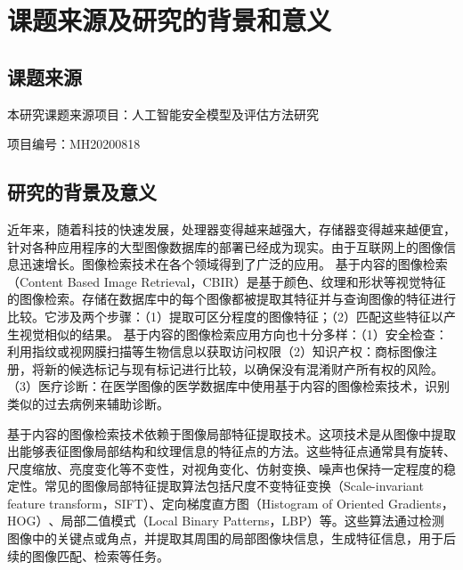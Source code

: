 \section{课题来源及研究的背景和意义}
\subsection{课题来源}
本研究课题来源项目：人工智能安全模型及评估方法研究
\par
项目编号：MH20200818
\subsection{研究的背景及意义}
近年来，随着科技的快速发展，处理器变得越来越强大，存储器变得越来越便宜，针对各种应用程序的大型图像数据库的部署已经成为现实。由于互联网上的图像信息迅速增长。图像检索技术在各个领域得到了广泛的应用。
基于内容的图像检索\cite{2015Content}（Content Based Image Retrieval，CBIR）是基于颜色、纹理和形状等视觉特征的图像检索。存储在数据库中的每个图像都被提取其特征并与查询图像的特征进行比较。它涉及两个步骤：（1）提取可区分程度的图像特征；（2）匹配这些特征以产生视觉相似的结果。
基于内容的图像检索应用方向也十分多样：（1）安全检查：利用指纹或视网膜扫描等生物信息以获取访问权限（2）知识产权：商标图像注册，将新的候选标记与现有标记进行比较，以确保没有混淆财产所有权的风险。（3）医疗诊断：在医学图像的医学数据库中使用基于内容的图像检索技术，识别类似的过去病例来辅助诊断。
\par
基于内容的图像检索技术依赖于图像局部特征提取技术。这项技术是从图像中提取出能够表征图像局部结构和纹理信息的特征点的方法。‌这些特征点通常具有旋转、‌尺度缩放、‌亮度变化等不变性，对视角变化、‌仿射变换、‌噪声也保持一定程度的稳定性。‌常见的图像局部特征提取算法包括‌尺度不变特征变换\cite{loweDistinctiveImageFeatures2004}（Scale-invariant feature transform，SIFT）、定向梯度直方图\cite{1467360}（Histogram of Oriented Gradients，HOG）‌、局部二值模式\cite{1017623}（Local Binary Patterns，LBP）‌等。‌这些算法通过检测图像中的关键点或角点，并提取其周围的局部图像块信息，生成特征信息，用于后续的图像匹配、‌检索等任务。

